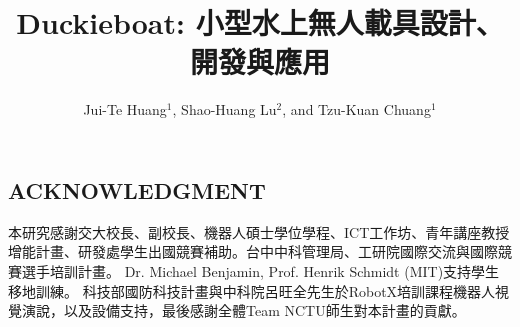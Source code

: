 \documentclass[letterpaper, 10 pt, conference]{ieeeconf}
\title{\LARGE \bf
Duckieboat: 小型水上無人載具設計、開發與應用}
\author{Jui-Te Huang$^{1}$, Shao-Huang Lu$^{2}$, and Tzu-Kuan Chuang$^{1}$}
\begin{document}
\begin{CJK}{UTF8}{bkai}

    \maketitle

    \thispagestyle{empty}
    \pagestyle{empty}


    

    

    

    






    \section*{ACKNOWLEDGMENT}

    本研究感謝交大校長、副校長、機器人碩士學位學程、ICT工作坊、青年講座教授增能計畫、研發處學生出國競賽補助。台中中科管理局、工研院國際交流與國際競賽選手培訓計畫。
    Dr. Michael Benjamin, Prof. Henrik Schmidt (MIT)支持學生移地訓練。
    科技部國防科技計畫與中科院呂旺全先生於RobotX培訓課程機器人視覺演說，以及設備支持，最後感謝全體Team NCTU師生對本計畫的貢獻。



    
    

\end{CJK}
\end{document}
